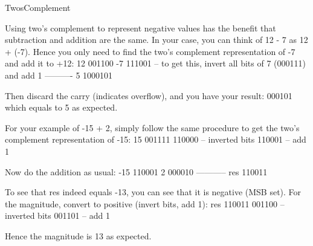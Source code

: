 TwosComplement

Using two's complement to represent negative values has the benefit that subtraction and addition are the same. In your case, you can think of 12 - 7 as 12 + (-7). Hence you only need to find the two's complement representation of -7 and add it to +12:
12  001100
-7  111001   -- to get this, invert all bits of 7 (000111) and add 1
----------
 5 1000101


Then discard the carry (indicates overflow), and you have your result: 000101 which equals to 5 as expected.

For your example of -15 + 2, simply follow the same procedure to get the two's complement representation of -15:
15  001111
    110000   -- inverted bits
    110001   -- add 1


Now do the addition as usual:
-15  110001
  2  000010
-----------
res  110011


To see that res indeed equals -13, you can see that it is negative (MSB set). For the magnitude, convert to positive (invert bits, add 1):
res  110011
     001100  -- inverted bits
     001101  -- add 1


Hence the magnitude is 13 as expected.


